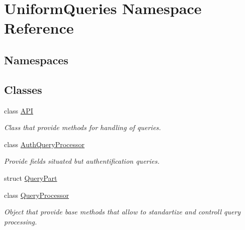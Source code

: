 \hypertarget{namespace_uniform_queries}{}\section{Uniform\+Queries Namespace Reference}
\label{namespace_uniform_queries}
\subsection*{Namespaces}
\begin{DoxyCompactItemize}
\end{DoxyCompactItemize}
\subsection*{Classes}
\begin{DoxyCompactItemize}
\item 
class \mbox{\hyperlink{class_uniform_queries_1_1_a_p_i}{A\+PI}}
\begin{DoxyCompactList}\small\item\em Class that provide methods for handling of queries. \end{DoxyCompactList}\item 
class \mbox{\hyperlink{class_uniform_queries_1_1_auth_query_processor}{Auth\+Query\+Processor}}
\begin{DoxyCompactList}\small\item\em Provide fields situated but authentification queries. \end{DoxyCompactList}\item 
struct \mbox{\hyperlink{struct_uniform_queries_1_1_query_part}{Query\+Part}}
\item 
class \mbox{\hyperlink{class_uniform_queries_1_1_query_processor}{Query\+Processor}}
\begin{DoxyCompactList}\small\item\em Object that provide base methods that allow to standartize and controll query processing. \end{DoxyCompactList}\end{DoxyCompactItemize}
